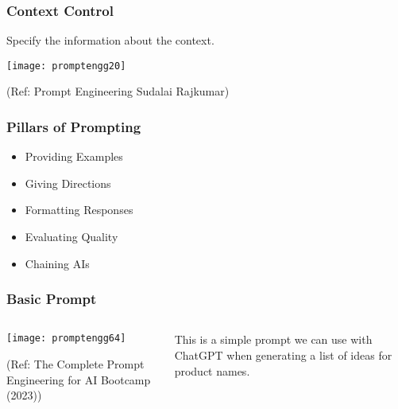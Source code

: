 \begin{frame}[fragile]\frametitle{Context Control}

Specify the information about the context.

\begin{center}
\texttt{[image: promptengg20]}

{\tiny (Ref: Prompt Engineering Sudalai Rajkumar)}

\end{center}		

\end{frame}



\begin{frame}[fragile]\frametitle{Pillars of Prompting}

\begin{itemize}
\item Providing Examples
\item Giving Directions
\item Formatting Responses
\item Evaluating Quality
\item Chaining AIs
\end{itemize}	 

\end{frame}

\begin{frame}[fragile]\frametitle{Basic Prompt}

\begin{columns}
    \begin{column}[T]{0.6\linewidth}
		\begin{center}
		\texttt{[image: promptengg64]}

		{\tiny (Ref: The Complete Prompt Engineering for AI Bootcamp (2023))}
		\end{center}	
    \end{column}
    \begin{column}[T]{0.4\linewidth}
		This is a simple prompt we can use with ChatGPT when generating a list of ideas
for product names.
    \end{column}
  \end{columns}
\end{frame}


